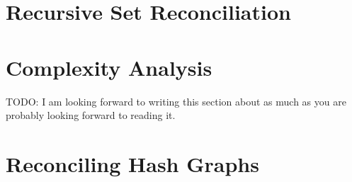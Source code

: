 \section{Recursive Set Reconciliation}
\label{set-reconciliation-def}

\section{Complexity Analysis}
\label{set-reconciliation-complexity}

TODO: I am looking forward to writing this section about as much as you are probably looking forward to reading it. 

\section{Reconciling Hash Graphs}
\label{set-reconciliation-simple-graphs}
